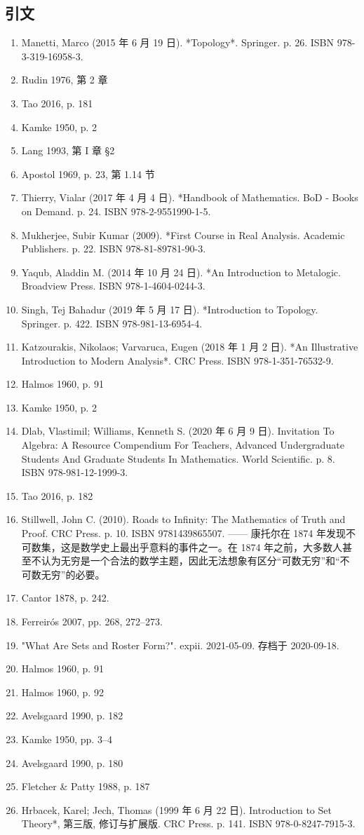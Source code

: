 {\subsection{引文}
\begin{enumerate}
\item Manetti, Marco (2015 年 6 月 19 日). *Topology*. Springer. p. 26. ISBN 978-3-319-16958-3.
\item Rudin 1976, 第 2 章
\item Tao 2016, p. 181
\item Kamke 1950, p. 2
\item Lang 1993, 第 I 章 §2
\item Apostol 1969, p. 23, 第 1.14 节
\item Thierry, Vialar (2017 年 4 月 4 日). *Handbook of Mathematics. BoD - Books on Demand. p. 24. ISBN 978-2-9551990-1-5.
\item Mukherjee, Subir Kumar (2009). *First Course in Real Analysis. Academic Publishers. p. 22. ISBN 978-81-89781-90-3.
\item Yaqub, Aladdin M. (2014 年 10 月 24 日). *An Introduction to Metalogic. Broadview Press. ISBN 978-1-4604-0244-3.
\item Singh, Tej Bahadur (2019 年 5 月 17 日). *Introduction to Topology. Springer. p. 422. ISBN 978-981-13-6954-4.
\item Katzourakis, Nikolaos; Varvaruca, Eugen (2018 年 1 月 2 日). *An Illustrative Introduction to Modern Analysis*. CRC Press. ISBN 978-1-351-76532-9.
\item Halmos 1960, p. 91
\item Kamke 1950, p. 2
\item Dlab, Vlastimil; Williams, Kenneth S. (2020 年 6 月 9 日). Invitation To Algebra: A Resource Compendium For Teachers, Advanced Undergraduate Students And Graduate Students In Mathematics. World Scientific. p. 8. ISBN 978-981-12-1999-3.
\item Tao 2016, p. 182
\item Stillwell, John C. (2010). Roads to Infinity: The Mathematics of Truth and Proof. CRC Press. p. 10. ISBN 9781439865507. —— 康托尔在 1874 年发现不可数集，这是数学史上最出乎意料的事件之一。在 1874 年之前，大多数人甚至不认为无穷是一个合法的数学主题，因此无法想象有区分“可数无穷”和“不可数无穷”的必要。
\item Cantor 1878, p. 242.
\item Ferreirós 2007, pp. 268, 272–273.
\item "What Are Sets and Roster Form?". expii. 2021-05-09. 存档于 2020-09-18.
\item Halmos 1960, p. 91
\item Halmos 1960, p. 92
\item Avelsgaard 1990, p. 182
\item Kamke 1950, pp. 3–4
\item Avelsgaard 1990, p. 180
\item Fletcher & Patty 1988, p. 187
\item Hrbacek, Karel; Jech, Thomas (1999 年 6 月 22 日). Introduction to Set Theory*, 第三版, 修订与扩展版. CRC Press. p. 141. ISBN 978-0-8247-7915-3.
\end{enumerate}
}
